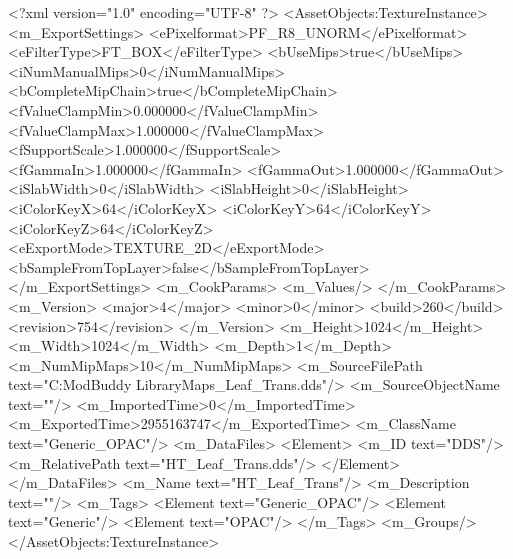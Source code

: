 <?xml version="1.0" encoding="UTF-8" ?>
<AssetObjects:TextureInstance>
	<m_ExportSettings>
		<ePixelformat>PF_R8_UNORM</ePixelformat>
		<eFilterType>FT_BOX</eFilterType>
		<bUseMips>true</bUseMips>
		<iNumManualMips>0</iNumManualMips>
		<bCompleteMipChain>true</bCompleteMipChain>
		<fValueClampMin>0.000000</fValueClampMin>
		<fValueClampMax>1.000000</fValueClampMax>
		<fSupportScale>1.000000</fSupportScale>
		<fGammaIn>1.000000</fGammaIn>
		<fGammaOut>1.000000</fGammaOut>
		<iSlabWidth>0</iSlabWidth>
		<iSlabHeight>0</iSlabHeight>
		<iColorKeyX>64</iColorKeyX>
		<iColorKeyY>64</iColorKeyY>
		<iColorKeyZ>64</iColorKeyZ>
		<eExportMode>TEXTURE_2D</eExportMode>
		<bSampleFromTopLayer>false</bSampleFromTopLayer>
	</m_ExportSettings>
	<m_CookParams>
		<m_Values/>
	</m_CookParams>
	<m_Version>
		<major>4</major>
		<minor>0</minor>
		<build>260</build>
		<revision>754</revision>
	</m_Version>
	<m_Height>1024</m_Height>
	<m_Width>1024</m_Width>
	<m_Depth>1</m_Depth>
	<m_NumMipMaps>10</m_NumMipMaps>
	<m_SourceFilePath text="C:\Users\Furion\Documents\Firaxis ModBuddy Library\STARK\Unfolded Maps\HT_Leaf_Trans.dds"/>
	<m_SourceObjectName text=""/>
	<m_ImportedTime>0</m_ImportedTime>
	<m_ExportedTime>2955163747</m_ExportedTime>
	<m_ClassName text="Generic_OPAC"/>
	<m_DataFiles>
		<Element>
			<m_ID text="DDS"/>
			<m_RelativePath text="HT_Leaf_Trans.dds"/>
		</Element>
	</m_DataFiles>
	<m_Name text="HT_Leaf_Trans"/>
	<m_Description text=""/>
	<m_Tags>
		<Element text="Generic_OPAC"/>
		<Element text="Generic"/>
		<Element text="OPAC"/>
	</m_Tags>
	<m_Groups/>
</AssetObjects:TextureInstance>

 